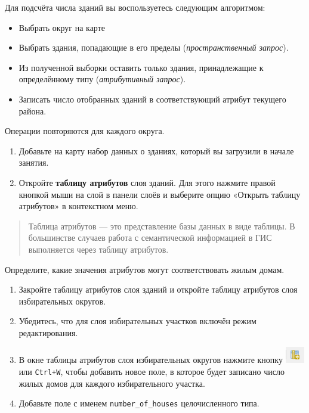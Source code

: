 \documentclass[
  12pt,
]{book}
\begin{document}
Для подсчёта числа зданий вы воспользуетесь следующим алгоритмом:

\begin{itemize}
\item
  Выбрать округ на карте
\item
  Выбрать здания, попадающие в его пределы (\emph{пространственный запрос}).
\item
  Из полученной выборки оставить только здания, принадлежащие к определённому типу (\emph{атрибутивный запрос}).
\item
  Записать число отобранных зданий в соответствующий атрибут текущего района.
\end{itemize}

Операции повторяются для каждого округа.

\begin{enumerate}
\def\labelenumi{\arabic{enumi}.}
\item
  Добавьте на карту набор данных о зданиях, который вы загрузили в начале занятия.
\item
  Откройте \textbf{таблицу атрибутов} слоя зданий. Для этого нажмите правой кнопкой мыши на слой в панели слоёв и выберите опцию «Открыть таблицу атрибутов» в контекстном меню.
\end{enumerate}

\begin{quote}
Таблица атрибутов --- это представление базы данных в виде таблицы. В большинстве случаев работа с семантической информацией в ГИС выполняется через таблицу атрибутов.
\end{quote}

Определите, какие значения атрибутов могут соответствовать жилым домам.

\begin{enumerate}
\def\labelenumi{\arabic{enumi}.}
\setcounter{enumi}{1}
\item
  Закройте таблицу атрибутов слоя зданий и откройте таблицу атрибутов слоя избирательных округов.
\item
  Убедитесь, что для слоя избирательных участков включён режим редактирования.
\item
  В окне таблицы атрибутов слоя избирательных округов нажмите кнопку \includegraphics{images/Ex05_Vectorization/button_addfield.png} или \texttt{Ctrl+W}, чтобы добавить новое поле, в которое будет записано число жилых домов для каждого избирательного участка.
\item
  Добавьте поле с именем \texttt{number\_of\_houses} целочисленного типа.
\end{enumerate}
\end{document}
